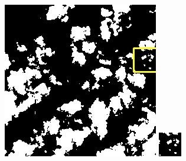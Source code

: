 \documentclass[UTF8]{ctexart}
\begin{document}
\begin{figure}[H]
{\begin{minipage}[b]{0.15\linewidth}
            \includegraphics[width=1\linewidth]{../log/cut/LC80980712014024LGN00_14882_my.jpg}\vspace{4pt}
            \includegraphics[width=1\linewidth]{../log/cut/tmp_cut_LC80980712014024LGN00_14882_my.jpg}

\end{minipage}}
\end{figure}
\end{document}
